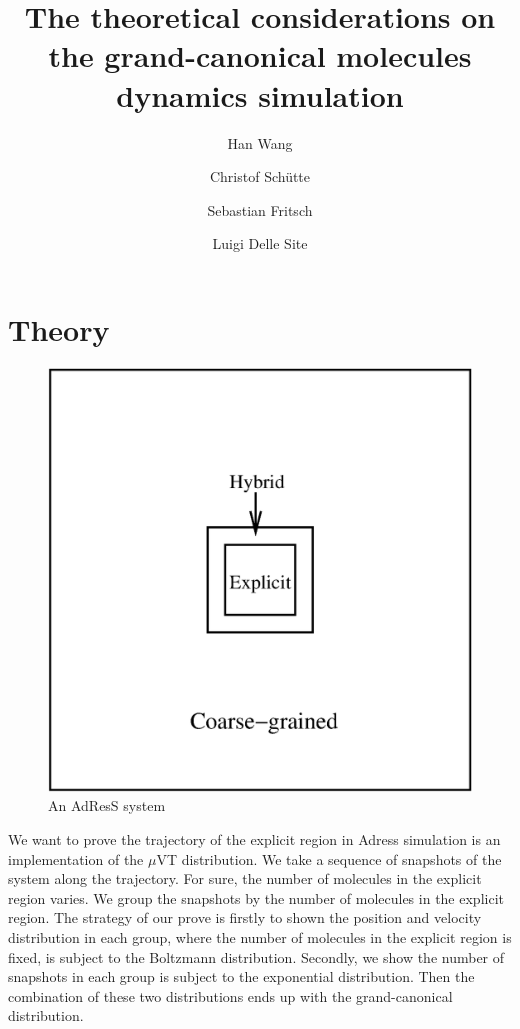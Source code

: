 \documentclass[aps,pre,preprint,unsortedaddress]{revtex4}
\begin{document}
\title{The theoretical considerations on the grand-canonical molecules dynamics simulation}
\author{Han Wang}
\author{Christof Sch\"utte}
\author{Sebastian Fritsch}
\author{Luigi Delle Site}

\begin{abstract}
\end{abstract}

\maketitle

\section{Theory}


\begin{figure}
  \centering
  \includegraphics[width=.5\textwidth]{fig/system/system.eps}
  \caption{An AdResS system}
  \label{fig:tmp1}
\end{figure}


We want to prove the trajectory of the explicit region in Adress
simulation is an implementation of the $\mu$VT distribution. We take a
sequence of snapshots of the system along the trajectory.  For sure,
the number of molecules in the explicit region varies. We group the
snapshots by the number of molecules in the explicit region.  The
strategy of our prove is firstly to shown the position and
velocity distribution in each group, where the number of molecules
in the explicit region is fixed, is subject to the Boltzmann
distribution. Secondly, we show the number of snapshots in each group
is subject to the exponential distribution. Then the combination of
these two distributions ends up with the grand-canonical distribution.
\end{document}
